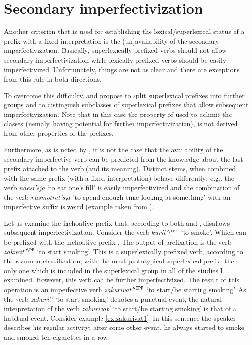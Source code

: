 \section{Secondary imperfectivization}\label{section:new:imperfectivization}
Another criterion that is used for establishing the lexical/superlexical status of a prefix with a fixed interpretation is the (un)availability of the secondary imperfectivization. Basically, superlexically prefixed verbs should not allow secondary imperfectivization while lexically prefixed verbs should be easily imperfectivized. Unfortunately, things are not as clear and there are exceptions from this rule in both directions. 

To overcome this difficulty, \citet{Svenonius:04b} and \citet{Tatevosov:07, Tatevosov:09} propose to split superlexical prefixes into further groups and to distinguish subclasses of superlexical prefixes that allow subsequent imperfectivization. Note that in this case the property of used to delimit the classes (nemaly, having potential for further imperfectivization), is not derived from other properties of the prefixes.

Furthermore, as is noted by \citet[35]{Kagan:book}, it is not the case that the availability of the secondary imperfective verb can be predicted from the knowledge about the last prefix attached to the verb (and its meaning). Distinct stems, when combined with the same prefix (with a fixed interpretation) behave differently: e.g., the verb \textit{naest’sja} `to eat one's fill' is easily imperfectivized and the combination of the verb \textit{nasmotret'sja} `to spend enough time looking at something' with an imperfective suffix is weird (example taken from \citealt[35]{Kagan:book}).

Let us examine the inchoative prefix  that, according to both \citet[230]{Svenonius:04b} and \citet[116]{Tatevosov:09}, disallows subsequent imperfectivization. Consider the verb \textit{kurit'}$^{\IPF}$ `to smoke'. Which can be prefixed with the inchoative prefix {.} The output of prefixation is the verb \textit{zakurit'}$^{\PF}$ `to start smoking'. This is a superlexically prefixed verb, according to the common classification, with the most prototypical superlexical prefix: the only one which is included in the superlexical group in all of the studies I examined. However, this verb can be further imperfectivized. The result of this operation is an imperfective verb \textit{zakurivat'}$^{\IPF}$ `to start/be starting smoking'. As the verb \textit{zakurit'} `to start smoking' denotes a punctual event, the natural interpretation of the verb \textit{zakurivat'} `to start/be starting smoking'  is that of a habitual event. Consider example \ref{ex:zakurivat1}. In this sentence the speaker describes his regular activity: after some other event, he always started to smoke and smoked ten cigarettes in a row. 

